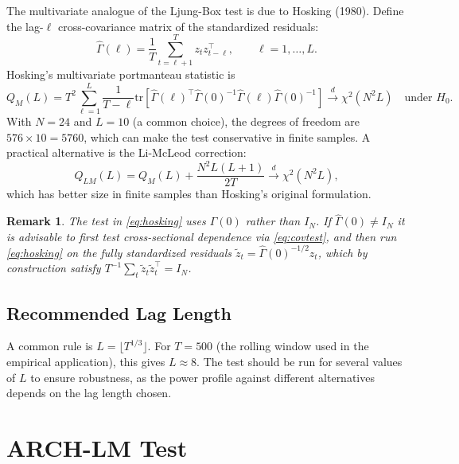 \documentclass[12pt]{article}
\newtheorem{remark}{Remark}
\begin{document}
The multivariate analogue of the Ljung-Box test is due to Hosking (1980). Define the
lag-$\ell$ cross-covariance matrix of the standardized residuals:
\begin{equation}
    \hat{\Gamma}(\ell) = \frac{1}{T} \sum_{t=\ell+1}^T z_t z_{t-\ell}^\top,
    \qquad \ell = 1, \ldots, L.
\end{equation}
Hosking's multivariate portmanteau statistic is
\begin{equation}
    Q_M(L) = T^2 \sum_{\ell=1}^{L} \frac{1}{T-\ell}
    \mathrm{tr}\!\left[\hat{\Gamma}(\ell)^\top \hat{\Gamma}(0)^{-1}
    \hat{\Gamma}(\ell) \hat{\Gamma}(0)^{-1}\right]
    \overset{d}{\to} \chi^2(N^2 L) \quad \text{under } H_0.
    \label{eq:hosking}
\end{equation}
With $N = 24$ and $L = 10$ (a common choice), the degrees of freedom are
$576 \times 10 = 5760$, which can make the test conservative in finite samples. A
practical alternative is the Li-McLeod correction:
\begin{equation}
    Q_{LM}(L) = Q_M(L) + \frac{N^2 L(L+1)}{2T}
    \overset{d}{\to} \chi^2(N^2 L),
\end{equation}
which has better size in finite samples than Hosking's original formulation.

\begin{remark}
    The test in \eqref{eq:hosking} uses $\hat{\Gamma}(0)$ rather than $I_N$. If
    $\hat{\Gamma}(0) \neq I_N$ it is advisable to first test cross-sectional
    dependence via \eqref{eq:covtest}, and then run \eqref{eq:hosking}
    on the fully standardized residuals $\tilde{z}_t = \hat{\Gamma}(0)^{-1/2} z_t$,
    which by construction satisfy $T^{-1}\sum_t \tilde{z}_t \tilde{z}_t^\top = I_N$.
\end{remark}

\subsection{Recommended Lag Length}

A common rule is $L = \lfloor T^{1/3} \rfloor$. For $T = 500$ (the rolling window used
in the empirical application), this gives $L \approx 8$. The test should be run for
several values of $L$ to ensure robustness, as the power profile against different
alternatives depends on the lag length chosen.

\section{ARCH-LM Test}
\end{document}
